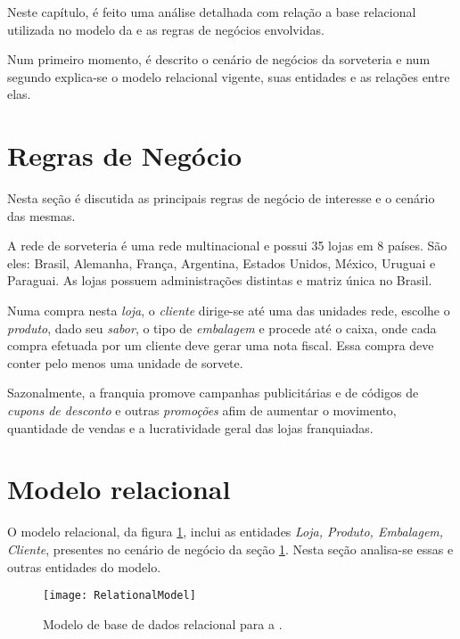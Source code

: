 \label{chap:RelationalModel}Neste capítulo, é feito uma análise detalhada com relação a base
relacional utilizada no modelo da \emph{\databaseName{}} e as regras de negócios envolvidas. 

Num primeiro momento, é descrito o cenário de negócios da sorveteria e num segundo explica-se o modelo
relacional vigente, suas entidades e as relações entre elas.

\section{Regras de Negócio}
\label{section:BusinessRules}
Nesta seção é  discutida as principais regras de negócio de interesse e o cenário das mesmas.

A rede de sorveteria \storeName{} é uma rede multinacional e possui 35 lojas em 8 países. São eles: Brasil, Alemanha, França, Argentina, Estados Unidos, México, Uruguai e Paraguai. As lojas possuem administrações distintas e matriz única no Brasil.

Numa compra nesta \emph{loja}, o \emph{cliente} dirige-se até uma das unidades rede, escolhe o \emph{produto}, dado seu \emph{sabor}, o tipo de \emph{embalagem} e procede até o caixa, onde cada compra efetuada por um cliente deve gerar uma nota fiscal. Essa compra deve conter pelo menos uma unidade de sorvete. 

Sazonalmente, a franquia promove campanhas publicitárias e de códigos de \emph{cupons de desconto} e outras \emph{promoções} afim de aumentar o movimento, quantidade de vendas e a lucratividade geral das lojas franquiadas.

\section{Modelo relacional}

O modelo relacional, da figura \ref{figure:RelationalModel}, inclui as entidades \emph{Loja, Produto, Embalagem, Cliente}, presentes no cenário de negócio da seção \ref{section:BusinessRules}. Nesta seção analisa-se essas e outras entidades do modelo.

\begin{landscape}
\begin{figure}[ht]
\begin{centering}
    \texttt{[image: RelationalModel]}
    \caption{Modelo de base de dados relacional para a \storeFullName{}.}
    \label{figure:RelationalModel}
\end{centering}
\end{figure}
\end{landscape}

